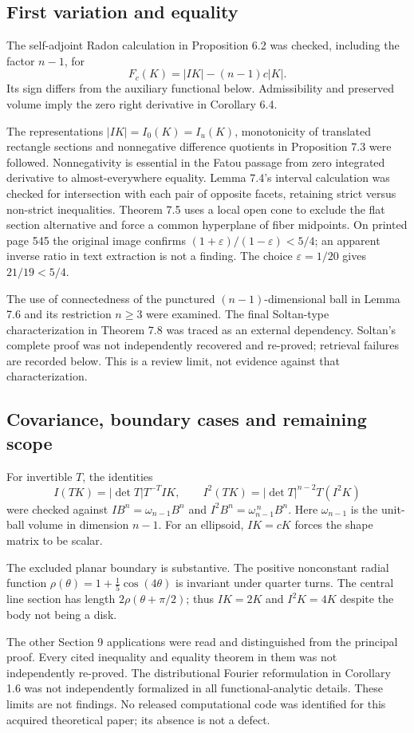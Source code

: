 \documentclass[10pt]{article}
\begin{document}
\subsection*{First variation and equality}
The self-adjoint Radon calculation in Proposition 6.2 was checked, including the factor \(n-1\), for \[F_c(K)=|IK|-(n-1)c|K|.\] Its sign differs from the auxiliary functional below. Admissibility and preserved volume imply the zero right derivative in Corollary 6.4.\par
The representations \(|IK|=I_0(K)=I_u(K)\), monotonicity of translated rectangle sections and nonnegative difference quotients in Proposition 7.3 were followed. Nonnegativity is essential in the Fatou passage from zero integrated derivative to almost-everywhere equality. Lemma 7.4’s interval calculation was checked for intersection with each pair of opposite facets, retaining strict versus non-strict inequalities. Theorem 7.5 uses a local open cone to exclude the flat section alternative and force a common hyperplane of fiber midpoints. On printed page 545 the original image confirms \((1+\varepsilon)/(1-\varepsilon)<5/4\); an apparent inverse ratio in text extraction is not a finding. The choice \(\varepsilon=1/20\) gives \(21/19<5/4\).\par
The use of connectedness of the punctured \((n-1)\)-dimensional ball in Lemma 7.6 and its restriction \(n\geq3\) were examined. The final Soltan-type characterization in Theorem 7.8 was traced as an external dependency. Soltan’s complete proof was not independently recovered and re-proved; retrieval failures are recorded below. This is a review limit, not evidence against that characterization.\par
\subsection*{Covariance, boundary cases and remaining scope}
For invertible \(T\), the identities \[I(TK)=|\det T|T^{-T}IK,\qquad
 I^2(TK)=|\det T|^{n-2}T(I^2K)\] were checked against \(IB^n=\omega_{n-1}B^n\) and \(I^2B^n=\omega_{n-1}^{\,n}B^n\). Here \(\omega_{n-1}\) is the unit-ball volume in dimension \(n-1\). For an ellipsoid, \(IK=cK\) forces the shape matrix to be scalar.\par
The excluded planar boundary is substantive. The positive nonconstant radial function \(\rho(\theta)=1+\tfrac15\cos(4\theta)\) is invariant under quarter turns. The central line section has length \(2\rho(\theta+\pi/2)\); thus \(IK=2K\) and \(I^2K=4K\) despite the body not being a disk.\par
The other Section 9 applications were read and distinguished from the principal proof. Every cited inequality and equality theorem in them was not independently re-proved. The distributional Fourier reformulation in Corollary 1.6 was not independently formalized in all functional-analytic details. These limits are not findings. No released computational code was identified for this acquired theoretical paper; its absence is not a defect.\par
\end{document}
